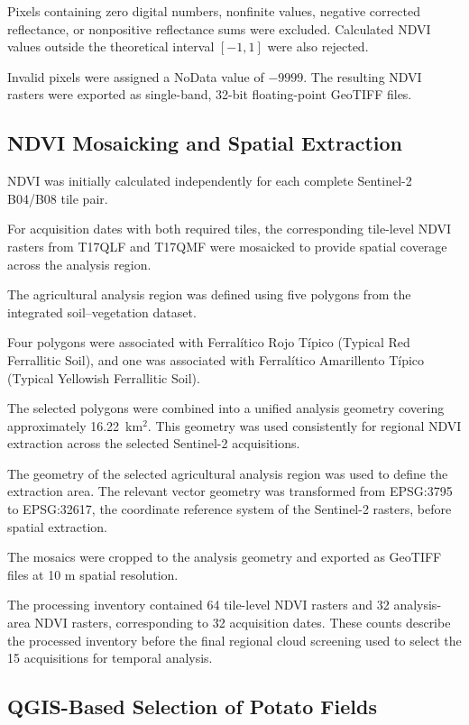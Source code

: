 Pixels containing zero digital numbers,
nonfinite values, negative corrected reflectance,
or nonpositive reflectance sums were excluded.
Calculated NDVI values outside the theoretical
interval $[-1,1]$ were also rejected.

Invalid pixels were assigned a NoData value
of $-9999$. The resulting NDVI rasters were
exported as single-band, 32-bit floating-point
GeoTIFF files.


\subsection{NDVI Mosaicking and Spatial Extraction}
\label{subsec:ndvi-processing}

NDVI was initially calculated independently
for each complete Sentinel-2 B04/B08 tile pair.

For acquisition dates with both required tiles,
the corresponding tile-level NDVI rasters from
T17QLF and T17QMF were mosaicked to provide
spatial coverage across the analysis region.

The agricultural analysis region was defined
using five polygons from the integrated
soil--vegetation dataset.

Four polygons were associated with
Ferralítico Rojo Típico
(Typical Red Ferrallitic Soil), and
one was associated with
Ferralítico Amarillento Típico
(Typical Yellowish Ferrallitic Soil).

The selected polygons were combined
into a unified analysis geometry
covering approximately 16.22~km$^2$.
This geometry was used consistently
for regional NDVI extraction across
the selected Sentinel-2 acquisitions.

The geometry of the selected agricultural
analysis region was used to define the
extraction area. The relevant vector geometry
was transformed from EPSG:3795 to EPSG:32617,
the coordinate reference system of the
Sentinel-2 rasters, before spatial extraction.

The mosaics were cropped to the analysis
geometry and exported as GeoTIFF files at
10 m spatial resolution.

The processing inventory contained 64
tile-level NDVI rasters and 32 analysis-area
NDVI rasters, corresponding to 32 acquisition
dates. These counts describe the processed
inventory before the final regional cloud
screening used to select the 15 acquisitions
for temporal analysis.


\subsection{QGIS-Based Selection of Potato Fields}
\label{subsec:qgis-potato-fields}

